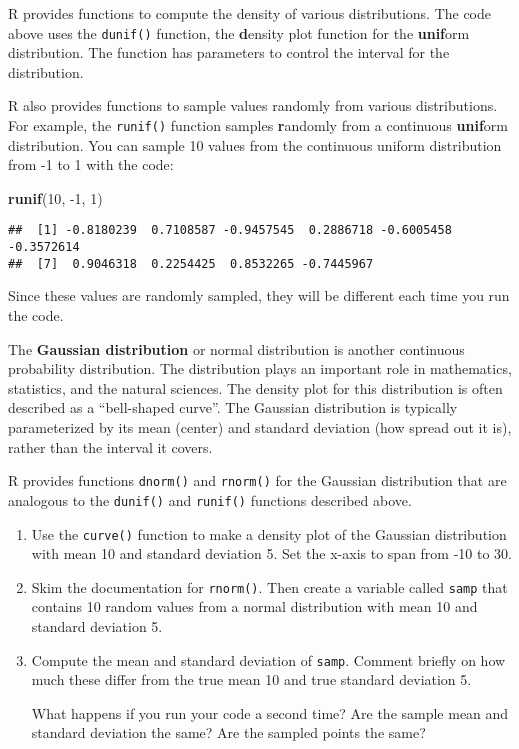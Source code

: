 \documentclass[
]{article}
\newenvironment{Shaded}{\begin{snugshade}}{\end{snugshade}}
\newcommand{\DecValTok}[1]{\textcolor[rgb]{0.00,0.00,0.81}{#1}}
\newcommand{\KeywordTok}[1]{\textcolor[rgb]{0.13,0.29,0.53}{\textbf{#1}}}
\newcommand{\NormalTok}[1]{#1}
\begin{document}
R provides functions to compute the density of various distributions.
The code above uses the \texttt{dunif()} function, the \textbf{d}ensity
plot function for the \textbf{unif}orm distribution. The function has
parameters to control the interval for the distribution.

R also provides functions to sample values randomly from various
distributions. For example, the \texttt{runif()} function samples
\textbf{r}andomly from a continuous \textbf{unif}orm distribution. You
can sample 10 values from the continuous uniform distribution from -1 to
1 with the code:

\begin{Shaded}
\begin{Highlighting}[]
\KeywordTok{runif}\NormalTok{(}\DecValTok{10}\NormalTok{, }\DecValTok{{-}1}\NormalTok{, }\DecValTok{1}\NormalTok{)}
\end{Highlighting}
\end{Shaded}

\begin{verbatim}
##  [1] -0.8180239  0.7108587 -0.9457545  0.2886718 -0.6005458 -0.3572614
##  [7]  0.9046318  0.2254425  0.8532265 -0.7445967
\end{verbatim}

Since these values are randomly sampled, they will be different each
time you run the code.

The \textbf{Gaussian distribution} or normal distribution is another
continuous probability distribution. The distribution plays an important
role in mathematics, statistics, and the natural sciences. The density
plot for this distribution is often described as a ``bell-shaped
curve''. The Gaussian distribution is typically parameterized by its
mean (center) and standard deviation (how spread out it is), rather than
the interval it covers.

R provides functions \texttt{dnorm()} and \texttt{rnorm()} for the
Gaussian distribution that are analogous to the \texttt{dunif()} and
\texttt{runif()} functions described above.

\begin{enumerate}
\def\labelenumi{\arabic{enumi}.}
\item
  Use the \texttt{curve()} function to make a density plot of the
  Gaussian distribution with mean 10 and standard deviation 5. Set the
  x-axis to span from -10 to 30.
\item
  Skim the documentation for \texttt{rnorm()}. Then create a variable
  called \texttt{samp} that contains 10 random values from a normal
  distribution with mean 10 and standard deviation 5.
\item
  Compute the mean and standard deviation of \texttt{samp}. Comment
  briefly on how much these differ from the true mean 10 and true
  standard deviation 5.

  What happens if you run your code a second time? Are the sample mean
  and standard deviation the same? Are the sampled points the same?
\end{enumerate}
\end{document}
